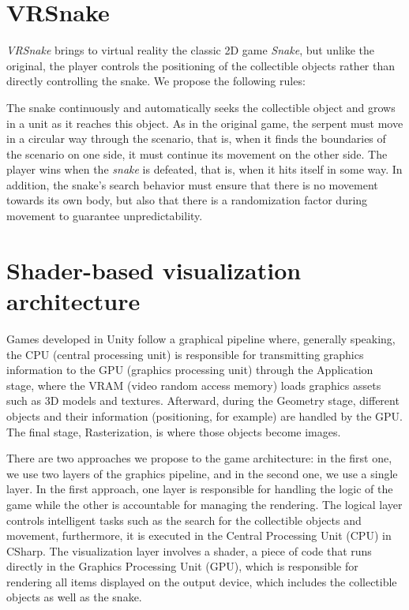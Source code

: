 \documentclass[12pt]{article}
\begin{document}
\section{VRSnake} \label{sec:vrsnake}
\textit{VRSnake} brings to virtual reality the classic 2D game \textit{Snake}, but unlike the original, the player controls the positioning of the collectible objects rather than directly controlling the snake. We propose the following rules: 

The snake continuously and automatically seeks the collectible object and grows in a unit as it reaches this object. As in the original game, the serpent must move in a circular way through the scenario, that is, when it finds the boundaries of the scenario on one side, it must continue its movement on the other side. The player wins when the \textit{snake} is defeated, that is, when it hits itself in some way. In addition, the snake's search behavior must ensure that there is no movement towards its own body, but also that there is a randomization factor during movement to guarantee unpredictability.

\section{Shader-based visualization architecture}
 \label{sec:architecture}
Games developed in Unity follow a graphical pipeline where, generally speaking, the CPU (central processing unit) is responsible for transmitting graphics information to the GPU (graphics processing unit) through the Application stage, where the VRAM (video random access memory) loads graphics assets such as 3D models and textures. Afterward, during the Geometry stage, different objects and their information (positioning, for example) are handled by the GPU. The final stage, Rasterization, is where those objects become images.

There are two approaches we propose to the game architecture: in the first one, we use two layers of the graphics pipeline, and in the second one, we use a single layer. In the first approach, one layer is responsible for handling the logic of the game while the other is accountable for managing the rendering.  The logical layer controls intelligent tasks such as the search for the collectible objects and movement, furthermore, it is executed in the Central Processing Unit (CPU) in CSharp. The visualization layer involves a shader, a piece of code that runs directly in the Graphics Processing Unit (GPU), which is responsible for rendering all items displayed on the output device, which includes the collectible objects as well as the snake.
\end{document}
